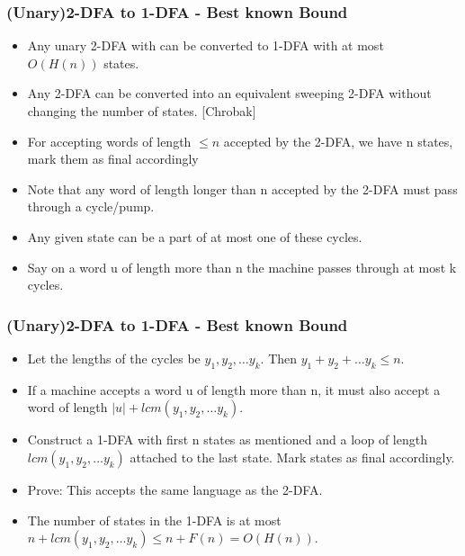 \documentclass{beamer}
\begin{document}
\begin{frame}
    \frametitle{(Unary)2-DFA to 1-DFA - Best known Bound}
    \begin{itemize}
        \item Any unary 2-DFA with can be converted to 1-DFA with at most $O(H(n))$ states.
        \item Any 2-DFA can be converted into an equivalent sweeping 2-DFA without changing the number of states. [Chrobak]
        \item For accepting words of length $\le n$ accepted by the 2-DFA, we have n states, mark them as final accordingly
        \item Note that any word of length longer than n accepted by the 2-DFA must pass through a cycle/pump.
        \item Any given state can be a part of at most one of these cycles.
        \item Say on a word u of length more than n the machine passes through at most k cycles.
        
    \end{itemize}

\end{frame}
\begin{frame}
    \frametitle{(Unary)2-DFA to 1-DFA - Best known Bound}
    \begin{itemize}
        \item Let the lengths of the cycles be $y_1,y_2,\ldots y_k$. Then $y_1+y_2+\ldots y_k \le n$.
        \item If a machine accepts a word u of length more than n, it must also accept a word of length $|u| + lcm(y_1,y_2,\ldots y_k)$.
        \item Construct a 1-DFA with first n states as mentioned and a loop of length $lcm(y_1,y_2,\ldots y_k)$ attached to the last state. Mark states as final accordingly.
        \item Prove: This accepts the same language as the 2-DFA.
        \item The number of states in the 1-DFA is at most $n + lcm(y_1,y_2,\ldots y_k) \le n + F(n) = O(H(n))$.
    \end{itemize}
\end{frame}
\end{document}
